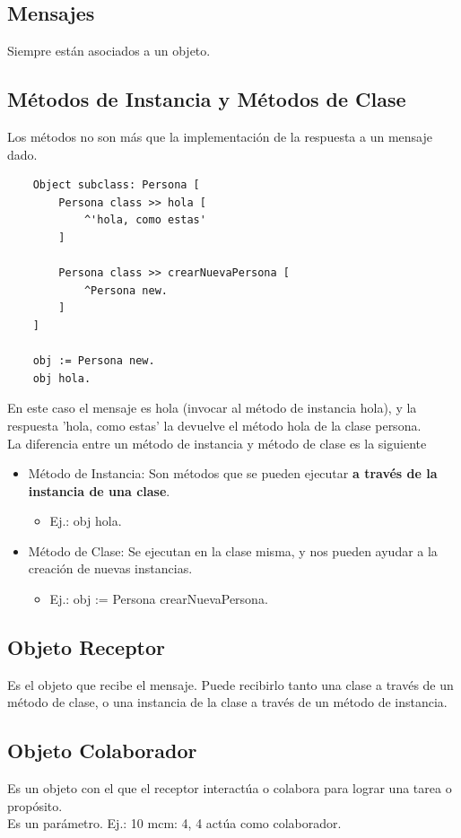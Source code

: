 \documentclass[10pt,a4paper]{article}
\begin{document}
\subsection*{Mensajes}
Siempre están asociados a un objeto.
\subsection*{Métodos de Instancia y Métodos de Clase}
Los métodos no son más que la implementación de la respuesta a un mensaje dado. \\
\begin{lstlisting}
    Object subclass: Persona [
        Persona class >> hola [
            ^'hola, como estas'
        ]

        Persona class >> crearNuevaPersona [
            ^Persona new.
        ]
    ]

    obj := Persona new.
    obj hola.
\end{lstlisting}
En este caso el mensaje es hola (invocar al método de instancia hola), y la respuesta 'hola, como estas' la devuelve el método hola de la clase persona. \\
La diferencia entre un método de instancia y método de clase es la siguiente 
\begin{itemize}
    \item Método de Instancia: Son métodos que se pueden ejecutar \textbf{a través de la instancia de una clase}.
    \begin{itemize}
        \item Ej.: obj hola.
    \end{itemize}
    \item Método de Clase: Se ejecutan en la clase misma, y nos pueden ayudar a la creación de nuevas instancias.
    \begin{itemize}
        \item Ej.: obj := Persona crearNuevaPersona.
    \end{itemize}
\end{itemize}
\subsection*{Objeto Receptor}
Es el objeto que recibe el mensaje. Puede recibirlo tanto una clase a través de un método de clase, o una instancia de la clase a través de un método de instancia. 
\subsection*{Objeto Colaborador}
Es un objeto con el que el receptor interactúa o colabora para lograr una tarea o propósito. \\
Es un parámetro. Ej.: 10 mcm: 4, 4 actúa como colaborador.
\end{document}
